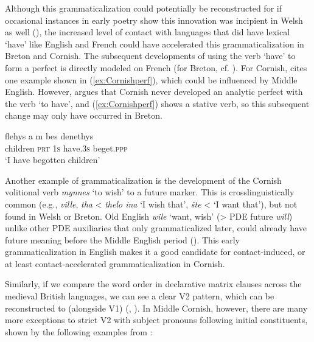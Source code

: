 \documentclass[output=paper,colorlinks,citecolor=brown]{langscibook}
\begin{document}
\noindent Although this grammaticalization could potentially be reconstructed for  if occasional instances in early poetry show this innovation was incipient in Welsh as well (\cite[50--52]{mm:lewis_llawlyfr_1966}), the increased level of contact with languages that did have lexical `have' like English and French could have accelerated this grammaticalization in Breton and Cornish. The subsequent developments of using the verb ‘have’ to form a perfect is directly modeled on French (for Breton, cf. \citealt{mm:WillisForth}). For Cornish, \citet[328]{mm:Williams2011} cites one example shown in (\ref{ex:Cornishperf}), which could be influenced by Middle English. However, \citet[258]{mm:padel_english_2021} argues that Cornish never developed an analytic perfect with the verb ‘to have’, and (\ref{ex:Cornishperf}) shows a stative verb, so this subsequent change may only have occurred in Breton.

\ea 
\settowidth{}
\gll flehys a m bes denethys \\
children \textsc{prt} \textsc{1s} have.\textsc{3s} beget.\textsc{ppp}\\ 
\glt `I have begotten children' 
\label{ex:Cornishperf}
\z 

\noindent Another example of grammaticalization is the development of the Cornish volitional verb \textit{mynnes} `to wish' to a future marker. This is crosslinguistically common (e.g.,  \textit{ville},  \textit{tha} < \textit{thelo ina} `I wish that',  \textit{šte} < `I want that'), but not found in Welsh or Breton. Old English \textit{wile} `want, wish' (> PDE future \textit{will}) unlike other PDE auxiliaries that only grammaticalized later, could already have future meaning before the Middle English period (\citealt{mm:warner_english_1993}). This early grammaticalization in English makes it a good candidate for contact-induced, or at least contact-accelerated grammaticalization in Cornish.

Similarly, if we compare the word order in declarative matrix clauses across the medieval British languages, we can see a clear V2 pattern, which can be reconstructed to  (alongside V1) (\citealt{mm:meelen_why_2016}, \citealt{mm:WillisForth}). In Middle Cornish, however, there are many more exceptions to strict V2 with subject pronouns following initial constituents, shown by the following examples from \citet[151, 155]{mm:eska_remarks_2021}:
\end{document}
